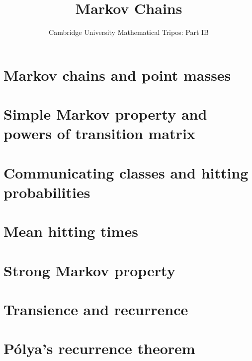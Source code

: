\documentclass{article}
\title{Markov Chains}
\author{Cambridge University Mathematical Tripos: Part IB}
\begin{document}
\maketitle

\tableofcontentsnewpage{}

\section{Markov chains and point masses}

\section{Simple Markov property and powers of transition matrix}

\section{Communicating classes and hitting probabilities}

\section{Mean hitting times}

\section{Strong Markov property}

\section{Transience and recurrence}

\section{P\'olya's recurrence theorem}

\end{document}
